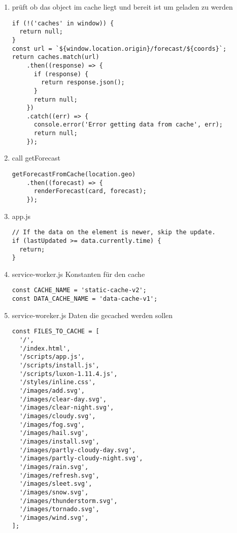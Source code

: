 \documentclass[oneside]{book}%
\begin{document}
\begin{appendix}
\begin{enumerate}
\item prüft ob das object im cache liegt und bereit ist um geladen zu werden
\begin{lstlisting}
if (!('caches' in window)) {
  return null;
}
const url = `${window.location.origin}/forecast/${coords}`;
return caches.match(url)
    .then((response) => {
      if (response) {
        return response.json();
      }
      return null;
    })
    .catch((err) => {
      console.error('Error getting data from cache', err);
      return null;
    });
\end{lstlisting}

\item call getForecast
\begin{lstlisting}
getForecastFromCache(location.geo)
    .then((forecast) => {
      renderForecast(card, forecast);
    });
\end{lstlisting}

\item app.js
\begin{lstlisting}
// If the data on the element is newer, skip the update.
if (lastUpdated >= data.currently.time) {
  return;
}
\end{lstlisting}

\item service-worker.js Konstanten für den cache
\begin{lstlisting}
const CACHE_NAME = 'static-cache-v2';
const DATA_CACHE_NAME = 'data-cache-v1';
\end{lstlisting}

\item service-woreker.js Daten die gecached werden sollen
\begin{lstlisting}
const FILES_TO_CACHE = [
  '/',
  '/index.html',
  '/scripts/app.js',
  '/scripts/install.js',
  '/scripts/luxon-1.11.4.js',
  '/styles/inline.css',
  '/images/add.svg',
  '/images/clear-day.svg',
  '/images/clear-night.svg',
  '/images/cloudy.svg',
  '/images/fog.svg',
  '/images/hail.svg',
  '/images/install.svg',
  '/images/partly-cloudy-day.svg',
  '/images/partly-cloudy-night.svg',
  '/images/rain.svg',
  '/images/refresh.svg',
  '/images/sleet.svg',
  '/images/snow.svg',
  '/images/thunderstorm.svg',
  '/images/tornado.svg',
  '/images/wind.svg',
];
\end{lstlisting}


\end{enumerate}
\end{appendix}
\end{document}
